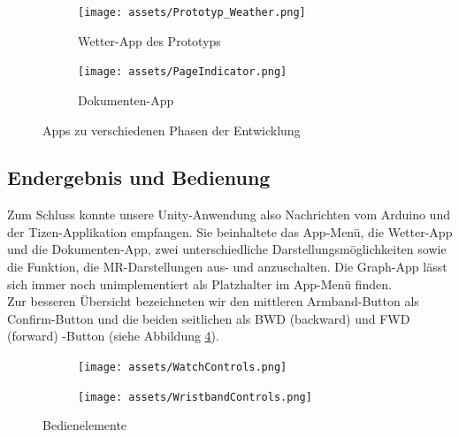 \documentclass[11pt, a4paper]{article}
\begin{document}
\begin{figure}[h]
	\begin{subfigure}[c]{0.4\textwidth}
        \centering
	   \texttt{[image: assets/Prototyp\_Weather.png]}
	   \caption{Wetter-App des Prototyps}
	   \label{fig:first_weatherApp}
	\end{subfigure}
	\begin{subfigure}[c]{0.5\textwidth}
        \centering
	   \texttt{[image: assets/PageIndicator.png]}
	   \caption{Dokumenten-App}
	   \label{fig:documentsApp}
	\end{subfigure}
    \centering
	\caption{Apps zu  verschiedenen Phasen der Entwicklung}
\end{figure}

\subsection{Endergebnis und Bedienung}

Zum Schluss konnte unsere Unity-Anwendung also Nachrichten vom Arduino und der Tizen-Applikation empfangen. Sie beinhaltete das App-Menü, die Wetter-App und die Dokumenten-App, zwei unterschiedliche Darstellungsmöglichkeiten sowie die Funktion, die MR-Darstellungen aus- und anzuschalten. Die Graph-App lässt sich immer noch unimplementiert als Platzhalter im App-Menü finden.\\
Zur besseren Übersicht bezeichneten wir den mittleren Armband-Button als Confirm-Button und die beiden seitlichen als BWD (backward) und FWD (forward) -Button (siehe Abbildung \ref{fig:controls}).\\

\begin{figure}[h]
	\begin{subfigure}[c]{0.4\textwidth}
        \centering
		\texttt{[image: assets/WatchControls.png]}
	\end{subfigure}
	\begin{subfigure}[c]{0.5\textwidth}
        \centering
		\texttt{[image: assets/WristbandControls.png]}
	\end{subfigure}
    \centering
	\caption{Bedienelemente}
    \label{fig:controls}
\end{figure}

\newpage
\end{document}
